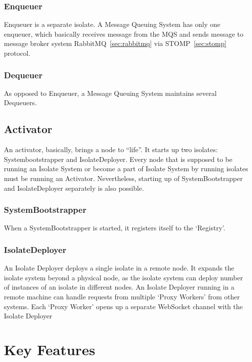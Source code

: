   \subsubsection{Enqueuer}
  Enqueuer is a separate isolate. A Message Queuing System has only one enqueuer, which basically receives message from the MQS and sends message to message broker system \textendash{} RabbitMQ~\ref{sec:rabbitmq} via STOMP~\ref{sec:stomp} protocol.

  \subsubsection{Dequeuer}
  As opposed to Enqueuer, a Message Queuing System maintains several Dequeuers.

\subsection{Activator}
  An activator, basically, brings a node to “life”. It starts up two isolates: Systembootstrapper and IsolateDeployer. Every node that is supposed to be running an Isolate System or become a part of Isolate System by running isolates must be running an Activator. Nevertheless, starting up of SystemBootstrapper and IsolateDeployer separately is also possible.
  \subsubsection{SystemBootstrapper}
When a SystemBootstrapper is started, it registers itself to the ‘Registry’.
  \subsubsection{IsolateDeployer}
An Isolate Deployer deploys a single isolate in a remote node. It expands the isolate system beyond a physical node, as the isolate system can deploy number of instances of an isolate in different nodes.
An Isolate Deployer running in a remote machine can handle requests from multiple ‘Proxy Workers’ from other systems. Each ‘Proxy Worker’ opens up a separate WebSocket channel with the Isolate Deployer

\section{Key Features}
